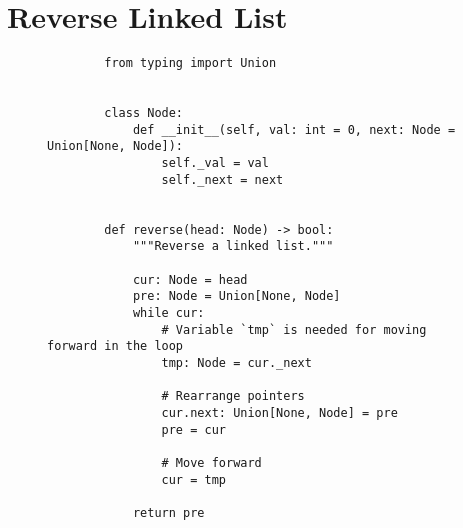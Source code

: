 
\section{Reverse Linked List}

\begin{figure}[H]
    \centering
    \begin{verbatim}
        from typing import Union


        class Node:
            def __init__(self, val: int = 0, next: Node = Union[None, Node]):
                self._val = val
                self._next = next


        def reverse(head: Node) -> bool:
            """Reverse a linked list."""

            cur: Node = head
            pre: Node = Union[None, Node]
            while cur:
                # Variable `tmp` is needed for moving forward in the loop
                tmp: Node = cur._next

                # Rearrange pointers
                cur.next: Union[None, Node] = pre
                pre = cur

                # Move forward
                cur = tmp

            return pre
    \end{verbatim}
\end{figure}
